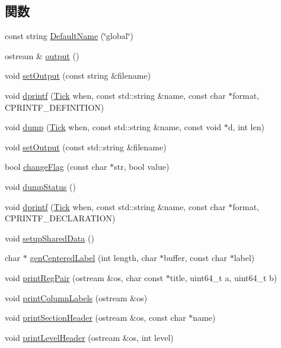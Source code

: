 \subsection*{関数}
\begin{DoxyCompactItemize}
\item 
const string \hyperlink{namespaceTrace_a8606dda8a833927860293af0c77f06a4}{DefaultName} (\char`\"{}global\char`\"{})
\item 
ostream \& \hyperlink{namespaceTrace_a926e8ac599a26341584088a3d3eec751}{output} ()
\item 
void \hyperlink{namespaceTrace_ae05e11a017b6a616b42b8466c09a5dd1}{setOutput} (const string \&filename)
\item 
void \hyperlink{namespaceTrace_a06c3e4f91b64a7d89d659141b272bccc}{dprintf} (\hyperlink{base_2types_8hh_a5c8ed81b7d238c9083e1037ba6d61643}{Tick} when, const std::string \&name, const char $\ast$format, CPRINTF\_\-DEFINITION)
\item 
void \hyperlink{namespaceTrace_a2fa429d80084fb5be809ab7b728be345}{dump} (\hyperlink{base_2types_8hh_a5c8ed81b7d238c9083e1037ba6d61643}{Tick} when, const std::string \&name, const void $\ast$d, int len)
\item 
void \hyperlink{namespaceTrace_a328abf4c8a23042eb4edd3b0807b81ab}{setOutput} (const std::string \&filename)
\item 
bool \hyperlink{namespaceTrace_a0906ddd3d2ff2195baef2184cd546aa3}{changeFlag} (const char $\ast$str, bool value)
\item 
void \hyperlink{namespaceTrace_a63d683419f79ed96f6bc3032736c4d4d}{dumpStatus} ()
\item 
void \hyperlink{namespaceTrace_abeb8fab1f3446f7c844c2770dab2c616}{dprintf} (\hyperlink{base_2types_8hh_a5c8ed81b7d238c9083e1037ba6d61643}{Tick} when, const std::string \&name, const char $\ast$format, CPRINTF\_\-DECLARATION)
\item 
void \hyperlink{namespaceTrace_a577907a8a8a528fe0e43d77c4123492d}{setupSharedData} ()
\item 
char $\ast$ \hyperlink{namespaceTrace_a79a728bff493511191c670c3657933b4}{genCenteredLabel} (int length, char $\ast$buffer, const char $\ast$label)
\item 
void \hyperlink{namespaceTrace_a268b6c6447c26a1dc793055948257708}{printRegPair} (ostream \&os, char const $\ast$title, uint64\_\-t a, uint64\_\-t b)
\item 
void \hyperlink{namespaceTrace_ae49f34c38f6236671a5f24356a57390f}{printColumnLabels} (ostream \&os)
\item 
void \hyperlink{namespaceTrace_a3111fc48b5ce2a07d14c114691609c08}{printSectionHeader} (ostream \&os, const char $\ast$name)
\item 
void \hyperlink{namespaceTrace_a875823c92c10db29fa8bdbd50c699519}{printLevelHeader} (ostream \&os, int level)
\end{DoxyCompactItemize}
